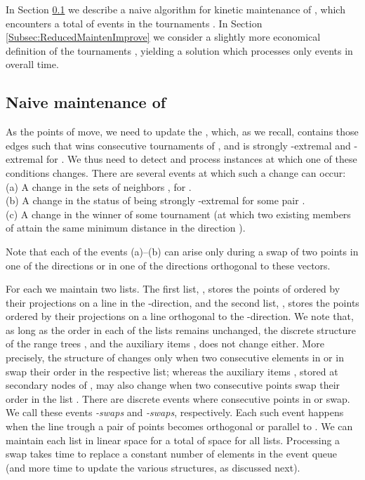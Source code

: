 \documentclass[letter,11pt]{article}
\begin{document}
In Section \ref{Subsec:ReducedMaintenNaive} we describe a naive algorithm for kinetic maintenance of , which encounters a total of  events in the tournaments . In Section \ref{Subsec:ReducedMaintenImprove} we consider a slightly more economical definition of the tournaments , yielding a solution which processes only  events in  overall time.
\subsection{Naive maintenance of }\label{Subsec:ReducedMaintenNaive}
As the points of  move, we need to update the  , which, as we recall, contains those edges  such that  wins  consecutive tournaments  of , and  is strongly -extremal and -extremal for . We thus need to detect and process instances at which one of these conditions changes. There are several events at which such a change can occur:\\
\indent(a) A change in the sets of neighbors , for .\\
\indent(b) A change in the status of being strongly -extremal for some pair .\\
\indent(c) A change in the winner of some tournament  (at which two existing members of  attain the same minimum distance in the direction ).

Note that each of the events (a)--(b) can arise only during a swap of two points in one of the  directions  or in one of the directions orthogonal to these vectors. 

For each  we maintain two lists. The first list, , stores the
points of  ordered by their projections on a line in the -direction, and the second list, , stores the points ordered by their projections on a line orthogonal to the -direction. We note that, as long as the order in each of the  lists  remains unchanged, the discrete structure of the range trees , and the auxiliary items , does not change either. More precisely, the structure of  changes only when two consecutive elements in 
or in  swap their order in the respective list; whereas the auxiliary items , stored at secondary nodes of , may also change when two consecutive points swap their order in the list . 
There are  discrete events where consecutive points in  or 
swap. We call these events {\em -swaps} and \textit{-swaps}, respectively. Each such event happens
when the line trough a pair of points becomes orthogonal or parallel to . We
can maintain each list in linear space for a total of  space
for all lists. Processing a swap takes  time to replace a
constant number of elements in the event queue (and more time to update the various structures, as discussed next).
\end{document}
